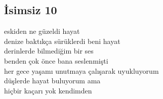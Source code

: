 \subsection{İsimsiz 10}

eskiden ne güzeldi hayat \\
	denize baktıkça sürüklerdi beni hayat \\
derinlerde bilmediğim bir ses \\
	benden çok önce bana seslenmişti \\

\noindent\newline
her gece yaşamı unutmaya çalışarak uyukluyorum \\
	düşlerde hayat buluyorum ama \\
hiçbir kaçarı yok kendimden \\